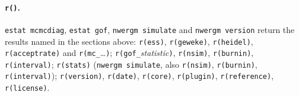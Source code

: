 \paragraph{\texttt{r()}.} \texttt{estat mcmcdiag}, \texttt{estat gof}, \texttt{nwergm simulate} and \texttt{nwergm version} return the results named in the sections above: \texttt{r(ess)}, \texttt{r(geweke)}, \texttt{r(heidel)}, \texttt{r(acceptrate)} and \texttt{r(mc\_}\ldots\texttt{)}; \texttt{r(gof\_}\emph{statistic}\texttt{)}, \texttt{r(nsim)}, \texttt{r(burnin)}, \texttt{r(interval)}; \texttt{r(stats)} (\texttt{nwergm simulate}, also \texttt{r(nsim)}, \texttt{r(burnin)}, \texttt{r(interval)}); \texttt{r(version)}, \texttt{r(date)}, \texttt{r(core)}, \texttt{r(plugin)}, \texttt{r(reference)}, \texttt{r(license)}.
